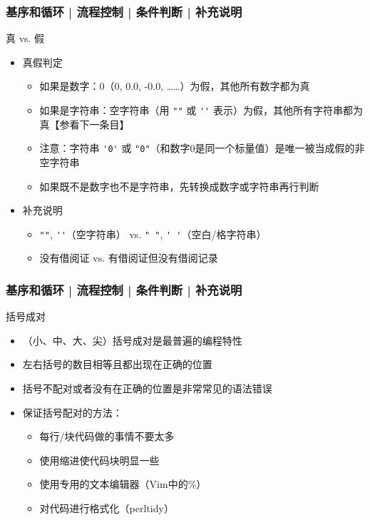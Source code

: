 \begin{frame}[fragile]
  \frametitle{基序和循环 | 流程控制 | 条件判断 | \alert{补充说明}}
  \begin{block}{真 vs. 假}
    \begin{itemize}
      \item 真假判定
       	\begin{itemize}
	        \item 如果是数字：0（0, 0.0, -0.0, ……）为假，其他所有数字都为真
          \item 如果是字符串：空字符串（用 \verb|""| 或 \verb|''| 表示）为假，其他所有字符串都为真【参看下一条目】
          \item 注意：字符串 \verb|'0'| 或 \verb|"0"|（和数字0是同一个标量值）是唯一被当成假的非空字符串
	        \item 如果既不是数字也不是字符串，先转换成数字或字符串再行判断
        \end{itemize}
      \item 补充说明
       	\begin{itemize}
          \item \verb|""|, \verb|''|（空字符串） vs. \verb|" "|, \verb|' '|（空白/格字符串）
          \item 没有借阅证 vs. 有借阅证但没有借阅记录
        \end{itemize}
    \end{itemize}
  \end{block}
\end{frame}

\begin{frame}
  \frametitle{基序和循环 | 流程控制 | 条件判断 | 补充说明}
  \begin{block}{括号成对}
    \begin{itemize}
	\item （小、中、大、尖）括号成对是最普遍的编程特性
	\item 左右括号的数目相等且都出现在正确的位置
	\item 括号不配对或者没有在正确的位置是非常常见的语法错误
	\item 保证括号配对的方法：
	  \begin{itemize}
	    \item 每行/块代码做的事情不要太多
	    \item 使用缩进使代码块明显一些
	    \item 使用专用的文本编辑器（Vim中的\%）
	    \item 对代码进行格式化（perltidy）
	  \end{itemize}
    \end{itemize}
  \end{block}
\end{frame}

